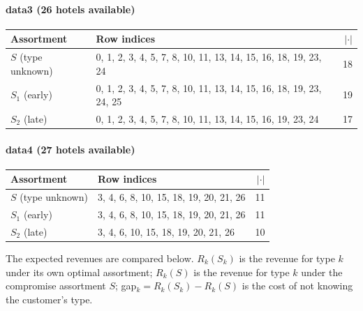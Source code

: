 \documentclass[11pt]{article}
\begin{document}
\paragraph{data3 \textnormal{(26 hotels available)}}
\begin{center}\small
\begin{tabular}{p{3.2cm}p{9.5cm}r}
\toprule
Assortment & Row indices & $|\cdot|$ \\
\midrule
$S$ (type unknown)  & 0, 1, 2, 3, 4, 5, 7, 8, 10, 11, 13, 14, 15, 16, 18, 19, 23, 24 & 18 \\
$S_1$ (early)       & 0, 1, 2, 3, 4, 5, 7, 8, 10, 11, 13, 14, 15, 16, 18, 19, 23, 24, 25 & 19 \\
$S_2$ (late)        & 0, 1, 2, 3, 4, 5, 7, 8, 10, 11, 13, 14, 15, 16, 19, 23, 24 & 17 \\
\bottomrule
\end{tabular}
\end{center}

\paragraph{data4 \textnormal{(27 hotels available)}}
\begin{center}\small
\begin{tabular}{p{3.2cm}p{9.5cm}r}
\toprule
Assortment & Row indices & $|\cdot|$ \\
\midrule
$S$ (type unknown)  & 3, 4, 6, 8, 10, 15, 18, 19, 20, 21, 26 & 11 \\
$S_1$ (early)       & 3, 4, 6, 8, 10, 15, 18, 19, 20, 21, 26 & 11 \\
$S_2$ (late)        & 3, 4, 6, 10, 15, 18, 19, 20, 21, 26 & 10 \\
\bottomrule
\end{tabular}
\end{center}

The expected revenues are compared below. $R_k(S_k)$ is the revenue for type $k$ under its own optimal assortment; $R_k(S)$ is the revenue for type $k$ under the compromise assortment $S$; gap$_k = R_k(S_k) - R_k(S)$ is the cost of not knowing the customer's type.

\begin{table}[h]
\centering
{}
\caption{Revenue comparisons across assortments. All revenues in \$.}
\end{table}
\end{document}
